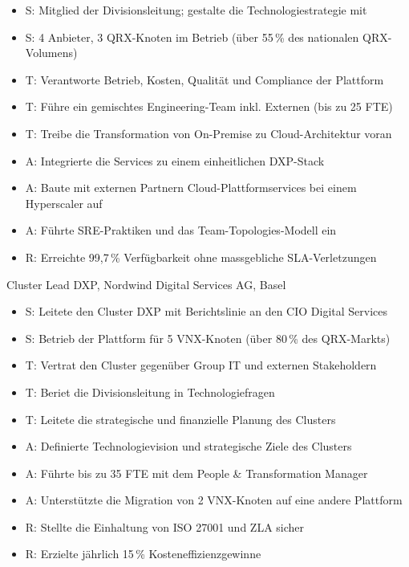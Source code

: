\documentclass[10.5pt,a4paper]{article}
\newlength{\datewidth}
\newcommand{\entryline}[2]{%
  \par\noindent\makebox[\datewidth][l]{#1}#2\par
}
\newenvironment{tightlist}{%
  \begin{itemize}[leftmargin=1.1em,itemsep=0pt,topsep=4pt,parsep=0pt,partopsep=0pt,label=\textbullet]
}{%
  \end{itemize}
}
\newcommand{\blockgap}{\vspace{8pt}}
\begin{document}
\begin{tightlist}
  \item S: Mitglied der Divisionsleitung; gestalte die Technologiestrategie mit
  \item S: 4 Anbieter, 3 QRX-Knoten im Betrieb (über 55\,\% des nationalen QRX-Volumens)
  \item T: Verantworte Betrieb, Kosten, Qualität und Compliance der Plattform
  \item T: Führe ein gemischtes Engineering-Team inkl. Externen (bis zu 25 FTE)
  \item T: Treibe die Transformation von On-Premise zu Cloud-Architektur voran
  \item A: Integrierte die Services zu einem einheitlichen DXP-Stack
  \item A: Baute mit externen Partnern Cloud-Plattformservices bei einem Hyperscaler auf
  \item A: Führte SRE-Praktiken und das Team-Topologies-Modell ein
  \item R: Erreichte 99,7\,\% Verfügbarkeit ohne massgebliche SLA-Verletzungen
\end{tightlist}

\blockgap

\entryline{09.2024 -- 12.2025}{Cluster Lead DXP, Nordwind Digital Services AG, Basel}

\begin{tightlist}
  \item S: Leitete den Cluster DXP mit Berichtslinie an den CIO Digital Services
  \item S: Betrieb der Plattform für 5 VNX-Knoten (über 80\,\% des QRX-Markts)
  \item T: Vertrat den Cluster gegenüber Group IT und externen Stakeholdern
  \item T: Beriet die Divisionsleitung in Technologiefragen
  \item T: Leitete die strategische und finanzielle Planung des Clusters
  \item A: Definierte Technologievision und strategische Ziele des Clusters
  \item A: Führte bis zu 35 FTE mit dem People \& Transformation Manager
  \item A: Unterstützte die Migration von 2 VNX-Knoten auf eine andere Plattform
  \item R: Stellte die Einhaltung von ISO 27001 und ZLA sicher
  \item R: Erzielte jährlich 15\,\% Kosteneffizienzgewinne
\end{tightlist}
\end{document}
